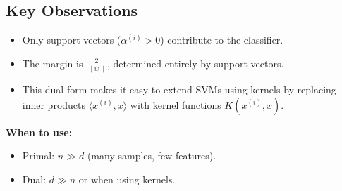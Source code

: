 \documentclass[11pt]{article}
\begin{document}
\subsection*{Key Observations}
\begin{itemize}
    \item Only support vectors ($\alpha^{(i)} > 0$) contribute to the classifier.
    \item The margin is $\tfrac{2}{\|w\|}$, determined entirely by support vectors.
    \item This dual form makes it easy to extend SVMs using kernels by replacing inner products $\langle x^{(i)}, x \rangle$ with kernel functions $K(x^{(i)}, x)$.
\end{itemize}

\textbf{When to use:}
\begin{itemize}
    \item Primal: $n \gg d$ (many samples, few features).
    \item Dual: $d \gg n$ or when using kernels.
\end{itemize}
\end{document}
